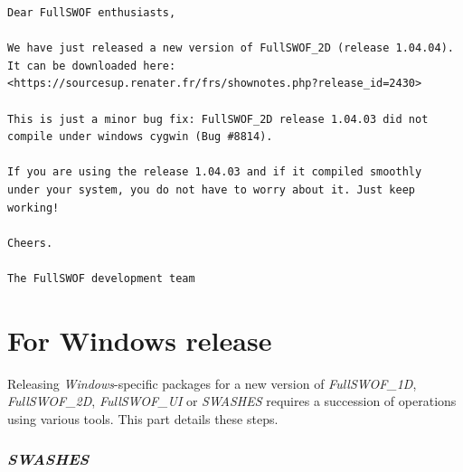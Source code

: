 \documentclass[a4paper, 11pt]{article}
\newcommand{\FullSWOFoneD}{\emph{FullSWOF\_1D}}
\newcommand{\FullSWOFtwoD}{\emph{FullSWOF\_2D}}
\newcommand{\FullSWOFUI}{\emph{FullSWOF\_UI}}
\newcommand{\SWASHES}{\emph{SWASHES}}
\begin{document}
\begin{enumerate}
\begin{verbatim}
Dear FullSWOF enthusiasts,

We have just released a new version of FullSWOF_2D (release 1.04.04).
It can be downloaded here:
<https://sourcesup.renater.fr/frs/shownotes.php?release_id=2430>

This is just a minor bug fix: FullSWOF_2D release 1.04.03 did not
compile under windows cygwin (Bug #8814).

If you are using the release 1.04.03 and if it compiled smoothly
under your system, you do not have to worry about it. Just keep working!

Cheers.

The FullSWOF development team 
\end{verbatim}
\end{enumerate}

\part{For Windows release}
\setcounter{section}{0}

Releasing \emph{Windows}-specific packages for a new version of \FullSWOFoneD, \FullSWOFtwoD{}, \FullSWOFUI{} or \SWASHES{} requires a succession of operations using various tools. 
This part details these steps.

\section{\SWASHES{}}
\end{document}
